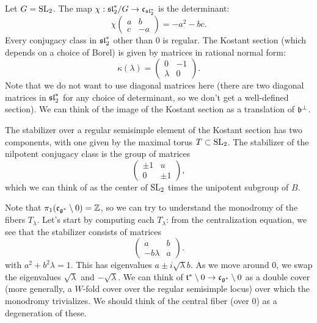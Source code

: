\documentclass{article}
\begin{document}
\begin{ex}
  Let $G = \operatorname{SL}_2$.
  The map $\chi: \mathfrak{sl}_2^* / G \to \mathfrak{c}_{\mathfrak{sl}_2^*}$ is the determinant:
  \[
    \chi \begin{pmatrix}
      a & b \\
      c & -a
    \end{pmatrix} = -a^2 - bc.
  \]
  Every conjugacy class in $\mathfrak{sl}_2^*$ other than $0$ is regular.
  The Kostant section (which depends on a choice of Borel) is given by matrices in rational normal form:
  \[
    \kappa(\lambda) = \begin{pmatrix}
      0 & -1 \\
      \lambda & 0
    \end{pmatrix}.
  \]
  Note that we do not want to use diagonal matrices here (there are two diagonal matrices in $\mathfrak{sl}_2^*$ for any choice of determinant, so we don't get a well-defined section).
  We can think of the image of the Kostant section as a translation of $\mathfrak{b}^\bot$.

  The stabilizer over a regular semisimple element of the Kostant section has two components, with one given by the maximal torus $T \subset \operatorname{SL}_2$.
  The stabilizer of the nilpotent conjugacy class is the group of matrices
  \[
    \begin{pmatrix}
      \pm 1 & u \\
      0 & \pm 1
    \end{pmatrix},
  \]
  which we can think of as the center of $\operatorname{SL}_2$ times the unipotent subgroup of $B$.
  
  Note that $\pi_1(\mathfrak{c}_{\mathfrak{g}^*} \setminus 0) = \mathbb{Z}$, so we can try to understand the monodromy of the fibers $T_\lambda$.
  Let's start by computing each $T_\lambda$: from the centralization equation, we see that the stabilizer consists of matrices
  \[
    \begin{pmatrix}
      a & b \\
      -b\lambda & a
    \end{pmatrix}.
  \]
  with $a^2 + b^2 \lambda = 1$.
  This has eigenvalues $a \pm i \sqrt{\lambda} b$.
  As we move around $0$, we swap the eigenvalues $\sqrt{\lambda}$ and $-\sqrt{\lambda}$.
  We can think of $\mathfrak{t}^* \setminus 0 \to \mathfrak{c}_{\mathfrak{g}^*} \setminus 0$ as a double cover (more generally, a $W$-fold cover over the regular semisimple locus) over which the monodromy trivializes.
  We should think of the central fiber (over $0$) as a degeneration of these.
\end{ex}
\end{document}

